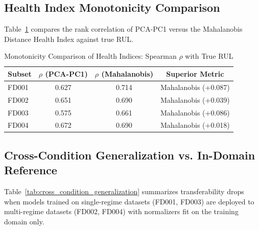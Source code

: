 \subsection{Health Index Monotonicity Comparison}
Table~\ref{tab:health_index_spearman} compares the rank correlation of PCA-PC1 versus the Mahalanobis Distance Health Index against true RUL.

\begin{table}[htbp]
\centering
\caption{Monotonicity Comparison of Health Indices: Spearman $\rho$ with True RUL}
\label{tab:health_index_spearman}
\begin{tabular}{lccc}
\toprule
\textbf{Subset} & \textbf{$\rho$ (PCA-PC1)} & \textbf{$\rho$ (Mahalanobis)} & \textbf{Superior Metric} \\
\midrule
FD001 & 0.627 & 0.714 & Mahalanobis (+0.087) \\
FD002 & 0.651 & 0.690 & Mahalanobis (+0.039) \\
FD003 & 0.575 & 0.661 & Mahalanobis (+0.086) \\
FD004 & 0.672 & 0.690 & Mahalanobis (+0.018) \\
\bottomrule
\end{tabular}
\end{table}

\subsection{Cross-Condition Generalization vs. In-Domain Reference}
Table~\ref{tab:cross_condition_generalization} summarizes transferability drops when models trained on single-regime datasets (FD001, FD003) are deployed to multi-regime datasets (FD002, FD004) with normalizers fit on the training domain only.

